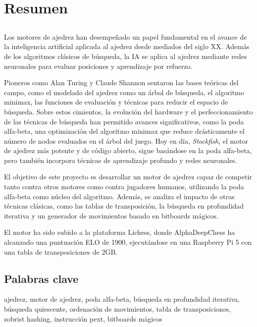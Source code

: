 \chapter*{Resumen}

\section*{\tituloPortadaVal}

Los motores de ajedrez han desempeñado un papel fundamental en el avance de la inteligencia artificial aplicada al ajedrez desde mediados del siglo XX. Además de los algoritmos clásicos de búsqueda, la IA se aplica al ajedrez mediante redes neuronales para evaluar posiciones y aprendizaje por refuerzo.

\vspace{1em}

\noindent Pioneros como Alan Turing y Claude Shannon sentaron las bases teóricas del campo, como el modelado del ajedrez como un árbol de búsqueda, el algoritmo minimax, las funciones de evaluación y técnicas para reducir el espacio de búsqueda. Sobre estos cimientos, la evolución del hardware y el perfeccionamiento de las técnicas de búsqueda han permitido avances significativos, como la poda alfa-beta, una optimización del algoritmo minimax que reduce drásticamente el número de nodos evaluados en el árbol del juego. Hoy en día, \textit{Stockfish}, el motor de ajedrez más potente y de código abierto, sigue basándose en la poda alfa-beta, pero también incorpora técnicas de aprendizaje profundo y redes neuronales.

\vspace{1em}

El objetivo de este proyecto es desarrollar un motor de ajedrez capaz de competir tanto contra otros motores como contra jugadores humanos, utilizando la poda alfa-beta como núcleo del algoritmo. Además, se analiza el impacto de otras técnicas clásicas, como las tablas de transposición, la búsqueda en profundidad iterativa y un generador de movimientos basado en bitboards mágicos.

\vspace{1em}

El motor ha sido subido a la plataforma Lichess, donde AlphaDeepChess ha alcanzado una puntuación ELO de 1900, ejecutándose en una Raspberry Pi 5 con una tabla de transposiciones de 2GB.

\section*{Palabras clave}
   
\noindent ajedrez, motor de ajedrez, poda alfa-beta, búsqueda en profundidad iterativa, búsqueda quiescente, ordenación de movimientos, tabla de transposiciones, zobrist hashing, instrucción pext, bitboards mágicos 
